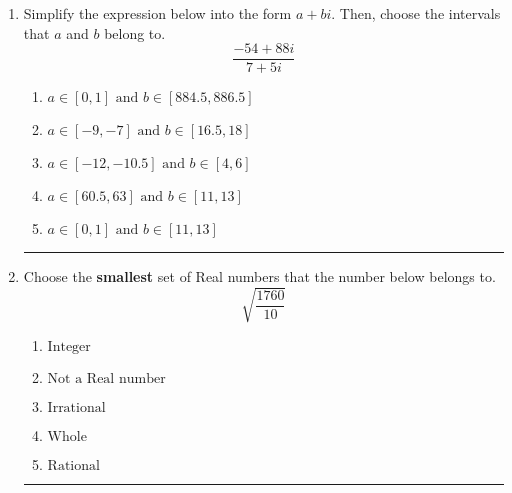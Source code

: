 \documentclass[14pt]{extbook}
\newcommand{\litem}[1]{\item#1\hspace*{-1cm}\rule{\textwidth}{0.4pt}}
\begin{document}
\begin{enumerate}
{\begin{enumerate}[label=\Alph*.]
\end{enumerate} }
\litem{
Simplify the expression below into the form $a+bi$. Then, choose the intervals that $a$ and $b$ belong to.\[ \frac{-54 + 88 i}{7 + 5 i} \]\begin{enumerate}[label=\Alph*.]
\item \( a \in [0, 1] \text{ and } b \in [884.5, 886.5] \)
\item \( a \in [-9, -7] \text{ and } b \in [16.5, 18] \)
\item \( a \in [-12, -10.5] \text{ and } b \in [4, 6] \)
\item \( a \in [60.5, 63] \text{ and } b \in [11, 13] \)
\item \( a \in [0, 1] \text{ and } b \in [11, 13] \)

\end{enumerate} }
\litem{
Choose the \textbf{smallest} set of Real numbers that the number below belongs to.\[ \sqrt{\frac{1760}{10}} \]\begin{enumerate}[label=\Alph*.]
\item \( \text{Integer} \)
\item \( \text{Not a Real number} \)
\item \( \text{Irrational} \)
\item \( \text{Whole} \)
\item \( \text{Rational} \)

\end{enumerate} }
\end{enumerate}
\end{document}
